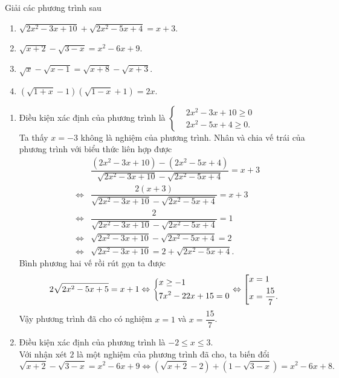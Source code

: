 \begin{bt}
	Giải các phương trình sau
	\begin{multicols}{2}
		\begin{enumerate}
			\item $\sqrt{2x^2-3x+10}+\sqrt{2x^2-5x+4}=x+3$.
			\item $\sqrt{x+2}-\sqrt{3-x}=x^2-6x+9$.
			\item $\sqrt{x}-\sqrt{x-1}=\sqrt{x+8}-\sqrt{x+3}$.
			\item $\left(\sqrt{1+x}-1\right)\left(\sqrt{1-x}+1\right)=2x$.
		\end{enumerate}
	\end{multicols}
	\loigiai
	{
		\begin{enumerate}
			\item Điều kiện xác định của phương trình là $\left\{\begin{aligned}&2x^2-3x+10\geq 0 \\&2x^2-5x+4 \geq 0.\end{aligned}\right.$\\
			Ta thấy $x=-3$ không là nghiệm của phương trình. Nhân và chia vế trái của phương trình với biểu thức liên hợp được
			\allowdisplaybreaks
			\begin{eqnarray*}
				&&\dfrac{\left(2x^2-3x+10\right)-\left(2x^2-5x+4\right)}{\sqrt{2x^2-3x+10}-\sqrt{2x^2-5x+4}}=x+3\\
				&\Leftrightarrow& \dfrac{2\left(x+3\right)}{\sqrt{2x^2-3x+10}-\sqrt{2x^2-5x+4}}=x+3\\
				&\Leftrightarrow& \dfrac{2}{\sqrt{2x^2-3x+10}-\sqrt{2x^2-5x+4}}=1\\
				&\Leftrightarrow& \sqrt{2x^2-3x+10}-\sqrt{2x^2-5x+4}=2\\
				&\Leftrightarrow& \sqrt{2x^2-3x+10}=2+\sqrt{2x^2-5x+4}.
			\end{eqnarray*}
			Bình phương hai vế rồi rút gọn ta được\\
			$$2\sqrt{2x^2-5x+5}=x+1\Leftrightarrow \left\{\begin{aligned}&x\ge -1\\&7x^2-22x+15=0\end{aligned}\right.\Leftrightarrow \left[\begin{aligned}&x=1\\&x=\dfrac{15}{7}.\end{aligned}\right.$$
			Vậy phương trình đã cho có nghiệm $x=1$ và $x=\dfrac{15}{7}$.
			\item Điều kiện xác định của phương trình là $-2\le x\le 3$.\\
			Với nhận xét $2$ là một nghiệm của phương trình đã cho, ta biến đổi\\
			$$\sqrt{x+2}-\sqrt{3-x}=x^2-6x+9\Leftrightarrow \left(\sqrt{x+2}-2\right)+\left(1-\sqrt{3-x}\right)=x^2-6x+8.$$

\end{enumerate}}
\end{bt}
